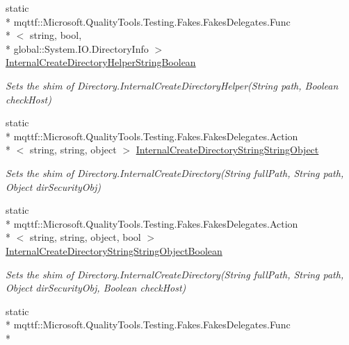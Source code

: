 \begin{DoxyCompactItemize}
static \\*
mqttf\-::\-Microsoft.\-Quality\-Tools.\-Testing.\-Fakes.\-Fakes\-Delegates.\-Func\\*
$<$ string, bool, \\*
global\-::\-System.\-I\-O.\-Directory\-Info $>$ \hyperlink{class_system_1_1_i_o_1_1_fakes_1_1_shim_directory_a1b54fa78b32ad43d1591e50da7a58903}{Internal\-Create\-Directory\-Helper\-String\-Boolean}
\begin{DoxyCompactList}\small\item\em Sets the shim of Directory.\-Internal\-Create\-Directory\-Helper(\-String path, Boolean check\-Host)\end{DoxyCompactList}\item 
static \\*
mqttf\-::\-Microsoft.\-Quality\-Tools.\-Testing.\-Fakes.\-Fakes\-Delegates.\-Action\\*
$<$ string, string, object $>$ \hyperlink{class_system_1_1_i_o_1_1_fakes_1_1_shim_directory_a1d52fb2e1003fc531bfb3a0a2068ee6e}{Internal\-Create\-Directory\-String\-String\-Object}
\begin{DoxyCompactList}\small\item\em Sets the shim of Directory.\-Internal\-Create\-Directory(\-String full\-Path, String path, Object dir\-Security\-Obj)\end{DoxyCompactList}\item 
static \\*
mqttf\-::\-Microsoft.\-Quality\-Tools.\-Testing.\-Fakes.\-Fakes\-Delegates.\-Action\\*
$<$ string, string, object, bool $>$ \hyperlink{class_system_1_1_i_o_1_1_fakes_1_1_shim_directory_a71ae18f89903ec853b128ea1cc2999eb}{Internal\-Create\-Directory\-String\-String\-Object\-Boolean}
\begin{DoxyCompactList}\small\item\em Sets the shim of Directory.\-Internal\-Create\-Directory(\-String full\-Path, String path, Object dir\-Security\-Obj, Boolean check\-Host)\end{DoxyCompactList}\item 
static \\*
mqttf\-::\-Microsoft.\-Quality\-Tools.\-Testing.\-Fakes.\-Fakes\-Delegates.\-Func\\*

\end{DoxyCompactItemize}
